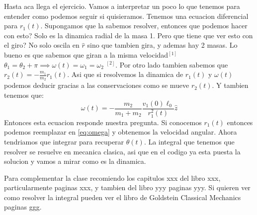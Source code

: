 \documentclass[12pt,a4paper]{article}
\begin{document}
Hasta aca llega el ejercicio. Vamos a interpretar un poco lo que tenemos para entender como podemos seguir si quisieramos. Tenemos una ecuacion diferencial para $r_1(t)$. Supongamos que la sabemos resolver, entonces que podemos hacer con esto? Solo es la dinamica radial de la masa 1. Pero que tiene que ver esto con el giro? No solo oscila en $\hat{r}$ sino que tambien gira, y ademas hay 2 masas. Lo bueno es que sabemos que giran a la misma velocidad$^{[1]}$ $\theta_1=\theta_2+\pi\implies \omega(t)=\omega_1=\omega_2$ $^{[2]}$. Por otro lado tambien sabemos que $r_2(t)=-\frac{m_1}{m_2}r_1(t)$. Asi que si resolvemos la dinamica de $r_1(t)$ y $\omega(t)$ podemos deducir gracias a las conservaciones como se mueve $r_2(t)$. Y tambien tenemos que:
\begin{equation}\label{eq:omega}
\omega(t)=-\frac{m_2}{m_1+m_2}\frac{v_1(0)\ell_0}{r_1^2(t)}\hat{z}
\end{equation}
Entonces esta ecuacion responde nuestra pregunta. Si conocemos $r_1(t)$ entonces podemos reemplazar en \ref{eq:omega} y obtenemos la velocidad angular. Ahora tendriamos que integrar para recuperar $\theta(t)$. La integral que tenemos que resolver se resuelve en mecanica clasica, asi que en el codigo ya esta puesta la solucion y vamos a mirar como es la dinamica. 

Para complementar la clase recomiendo los capitulos xxx del libro xxx, particularmente paginas xxx, y tambien del libro yyy paginas yyy. Si quieren ver como resolver la integral pueden ver el libro de Goldstein Classical Mechanics paginas ggg.
\end{document}
